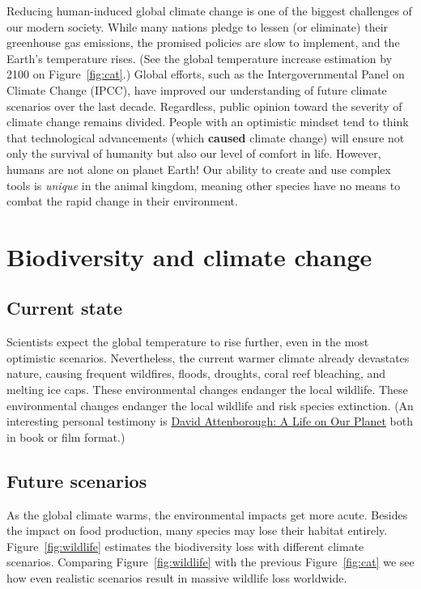 \documentclass[12pt]{article}
\begin{document}
Reducing human-induced global climate change is one of the biggest challenges of our modern society. While many nations pledge to lessen (or eliminate) their greenhouse gas emissions, the promised policies are slow to implement, and {\color{red} the Earth's temperature rises}. (See the global temperature increase estimation by 2100 on Figure~\ref{fig:cat}.) Global efforts, such as the Intergovernmental Panel on Climate Change (IPCC), have improved our understanding of future climate scenarios over the last decade. Regardless, public opinion toward the severity of climate change remains divided. People with an optimistic mindset tend to think that technological advancements (which \textbf{caused} climate change) will ensure not only the survival of humanity but also our level of comfort in life. However, humans are not alone on planet Earth! Our ability to create and use complex tools is \emph{unique} in the animal kingdom, meaning other species have no means to combat the rapid change in their environment.


\section{Biodiversity and climate change}

\subsection*{Current state}
Scientists expect the global temperature to rise further, even in the most optimistic scenarios. Nevertheless, the current warmer climate already devastates nature, causing frequent wildfires, floods, droughts, coral reef bleaching, and melting ice caps. These environmental changes endanger the local wildlife. These environmental changes endanger the local wildlife and risk species extinction. (An interesting personal testimony is \href{https://en.wikipedia.org/wiki/David_Attenborough:_A_Life_on_Our_Planet}{David Attenborough: A Life on Our Planet} both in book or film format.)

\subsection*{Future scenarios}

As the global climate warms, the environmental impacts get more acute. Besides the impact on food production, many species may lose their habitat entirely. Figure~\ref{fig:wildlife} estimates the biodiversity loss with different climate scenarios. Comparing Figure~\ref{fig:wildlife} with the previous Figure~\ref{fig:cat} we see how even realistic scenarios result in massive wildlife loss worldwide.
\end{document}
